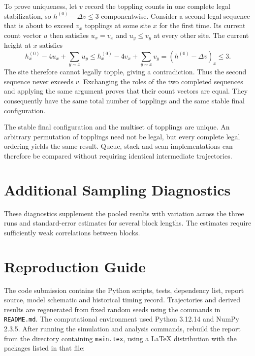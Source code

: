 \documentclass[11pt,a4paper,oneside]{report}
\numberwithin{equation}{chapter}
\begin{document}
To prove uniqueness, let $v$ record the toppling counts in one complete legal stabilization, so $h^{(0)}-\Delta v\leq3$ componentwise. Consider a second legal sequence that is about to exceed $v_x$ topplings at some site $x$ for the first time. Its current count vector $u$ then satisfies $u_x=v_x$ and $u_y\leq v_y$ at every other site. The current height at $x$ satisfies
\begin{equation}
 h_x^{(0)}-4u_x+\sum_{y\sim x}u_y
 \leq h_x^{(0)}-4v_x+\sum_{y\sim x}v_y
 =(h^{(0)}-\Delta v)_x\leq3.
\end{equation}
The site therefore cannot legally topple, giving a contradiction. Thus the second sequence never exceeds $v$. Exchanging the roles of the two completed sequences and applying the same argument proves that their count vectors are equal. They consequently have the same total number of topplings and the same stable final configuration.

The stable final configuration and the multiset of topplings are unique. An arbitrary permutation of topplings need not be legal, but every complete legal ordering yields the same result. Queue, stack and scan implementations can therefore be compared without requiring identical intermediate trajectories.

\chapter{Additional Sampling Diagnostics}
\label{app:diagnostics}
These diagnostics supplement the pooled results with variation across the three runs and standard-error estimates for several block lengths. The estimates require sufficiently weak correlations between blocks.


\FloatBarrier

\chapter{Reproduction Guide}
\label{app:reproduce}
The code submission contains the Python scripts, tests, dependency list, report source, model schematic and historical timing record. Trajectories and derived results are regenerated from fixed random seeds using the commands in \texttt{README.md}. The computational environment used Python 3.12.14 and NumPy 2.3.5. After running the simulation and analysis commands, rebuild the report from the directory containing \texttt{main.tex}, using a LaTeX distribution with the packages listed in that file:
\end{document}
